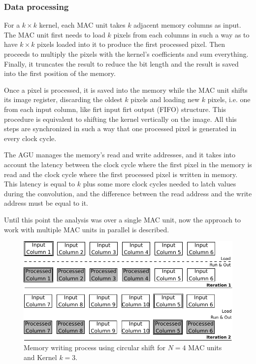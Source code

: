 \documentclass[conference,compsoc]{IEEEtran}
\begin{document}
\subsubsection{Data processing}\label{dataproc}
For a $k\times k$ kernel, each MAC unit takes $k$ adjacent memory columns as
input. The MAC unit first needs to load $k$ pixels from each columns in such a
way as to have $k\times k$ pixels loaded into it to produce the first processed
pixel. Then proceeds to multiply the pixels with the kernel's coefficients and
sum everything. Finally, it truncates the result to reduce the bit length and
the result is saved into the first position of the memory.

Once a pixel is processed, it is saved into the memory while the MAC unit shifts
its image register, discarding the oldest $k$ pixels and loading new $k$ pixels,
i.e. one from each input column, like firt input firt output (FIFO) structure.
This procedure is equivalent to shifting the kernel vertically on the image. All
this steps are synchronized in such a way that one processed pixel is generated
in every clock cycle.

The AGU manages the memory's read and write addresses, and it takes into account the
latency between the clock cycle where the first pixel in the memory is read and
the clock cycle where the first processed pixel is written in memory. This latency is
equal to $k$ plus some more clock cycles needed to latch values during the
convolution, and the difference between the read address and the write address
must be equal to it.

Until this point the analysis was over a single MAC unit, now the
approach to work with multiple MAC units in parallel is
described.

\begin{figure}[!t]
\centering
\includegraphics[scale=0.55]{algorithm}
\caption{Memory writing process using circular shift for $N = 4$ MAC units and
  Kernel $k = 3$.}
\label{algorithm}
\end{figure}
\end{document}
